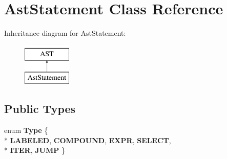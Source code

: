 \hypertarget{classAstStatement}{\section{Ast\-Statement Class Reference}
\label{classAstStatement}
}
Inheritance diagram for Ast\-Statement\-:\begin{figure}[H]
\begin{center}
\leavevmode
\includegraphics[height=2.000000cm]{classAstStatement}
\end{center}
\end{figure}
\subsection*{Public Types}
\begin{DoxyCompactItemize}
\item 
enum {\bfseries Type} \{ \\*
{\bfseries L\-A\-B\-E\-L\-E\-D}, 
{\bfseries C\-O\-M\-P\-O\-U\-N\-D}, 
{\bfseries E\-X\-P\-R}, 
{\bfseries S\-E\-L\-E\-C\-T}, 
\\*
{\bfseries I\-T\-E\-R}, 
{\bfseries J\-U\-M\-P}
 \}
\end{DoxyCompactItemize}

